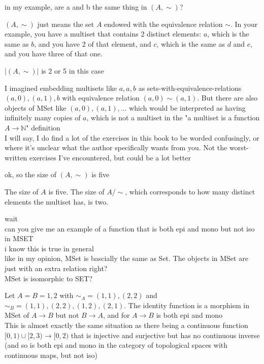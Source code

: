 \documentclass[15pt]{scrartcl}
\begin{document}
\begin{discussion*}
\begin{abboy*}
        in my example, are a and b the same thing in $(A,\sim)$?
    \end{abboy*}
    \begin{arthur*}
        $(A, \sim)$ just means the set $A$ endowed with the equivalence relation $\sim$. In your example, you have a multiset that contains 2 distinct elements: $a$, which is the same as $b$, and you have 2 of that element, and $c$, which is the same as $d$ and $e$, and you have three of that one.
    \end{arthur*}
    \begin{abboy*}
        $|(A,\sim)|$ is 2 or 5 in this case
    \end{abboy*}
    \begin{evie*}
        I imagined embedding multisets like ${a, a, b}$ as sets-with-equivalence-relations ${(a,0), (a,1), b}$ with equivalence relation $(a,0)\sim (a,1)$. But there are also objects of MSet like ${(a,0), (a,1), ...}$ which would be interpreted as having infinitely many copies of $a$, which is not a multiset in the "a multiset is a function $A\to\mathbb N$" definition 
        \\
        I will say, I do find a lot of the exercises in this book to be worded confusingly, or where it's unclear what the author specifically wants from you. Not the worst-written exercises I've encountered, but could be a lot better
    \end{evie*}
    \begin{abboy*}
        ok, so the size of $(A,\sim)$ is five
    \end{abboy*}
    \begin{evie*}
        The size of $A$ is five. The size of $A/\sim$, which corresponds to how many distinct elements the multiset has, is two.
    \end{evie*}
    \begin{abboy*}
        wait
        \\
        can you give me an example of a function that is both epi and mono but not iso in MSET
        \\
        i know this is true in general
        \\
        like in my opinion, MSet is bascially the same as Set. The objects in MSet are just with an extra relation right?
        \\
        MSet is isomorphic to SET?
    \end{abboy*}
    \begin{evie*}
        Let $A=B={1,2}$ with $\sim_A = {(1,1),(2,2)}$ and $\sim_B={(1,1),(2,2),(1,2),(2,1)}$. The identity function is a morphism in MSet of $A\to B$ but not $B\to A$, and for $A\to B$ is both epi and mono
        \\
        This is almost exactly the same situation as there being a continuous function $[0,1)\cup [2,3)\to [0,2)$ that is injective and surjective but has no continuous inverse (and so is both epi and mono in the category of topological spaces with continuous maps, but not iso) 
    \end{evie*}

\end{discussion*}
\end{document}
